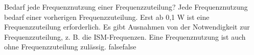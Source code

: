     {Bedarf jede Frequenznutzung einer Frequenzzuteilung?}
    {Jede Frequenznutzung bedarf einer vorherigen Frequenzzuteilung.}
    {Erst ab 0,1 W ist eine Frequenzzuteilung erforderlich.}
    {Es gibt Ausnahmen von der Notwendigkeit zur Frequenzzuteilung, z. B. die ISM-Frequenzen.}
    {Eine Frequenznutzung ist auch ohne Frequenzzuteilung zulässig.}
    {false}{false}
